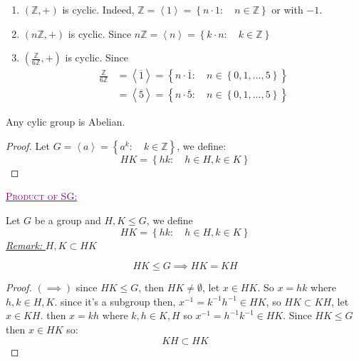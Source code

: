 \begin{example}
\begin{enumerate}
\item $(\mathbb{Z}, +)  $ is cyclic. Indeed, $\mathbb{Z} = \left\langle 1 \right\rangle  = 
  \left\{ n \cdot 1: \quad n \in \mathbb{Z} \right\}$ or with $-1$. 
  \item $\left( n \mathbb{Z}, + \right) $  is cyclic. Since $n \mathbb{Z} =\left\langle n \right\rangle  = 
    \left\{ k \cdot n: \quad k \in \mathbb{Z} \right\}$ 
    \item $\left( 
        \frac{\mathbb{Z}}{6 \mathbb{Z}}, +
      \right)$ is cyclic. Since 
      \begin{align*}
      \frac{\mathbb{Z}}{6 \mathbb{Z}} &= 
      \left\langle 
        \overline{1}
      \right\rangle = 
      \left\{ n \cdot  \overline{1}: \quad n \in \left\{ 0, 1, \hdots , 5 \right\} \right\} \\
                                      &= 
                    \left\langle \overline{5} \right\rangle  = 
                    \left\{ n \cdot \overline{5}: \quad n \in  \left\{ 0, 1, \hdots , 5 \right\} \right\}
      \end{align*}
\end{enumerate}
\end{example}
\begin{proposition}[]
Any cylic group is Abelian.
\end{proposition}
\begin{proof}
Let $G = \left\langle a \right\rangle = \left\{ a ^{k}: \quad k \in \mathbb{Z} \right\} $, we 
define: 
\[
HK = \left\{ hk: \quad h \in  H, k \in  K \right\}
\]
\end{proof}
\divider
\begin{center}
 \textcolor{purple}{\underline{\textsc{Product of SG:}}} 
\end{center}
Let $G $ be a group and $H, K \leq G $, we define 
\[
HK = 
\left\{ hk: \quad h \in H, k \in K \right\}
\]
\underline{\emph{Remark: }} $H, K \subset HK $ 
\begin{proposition}[]
\[
HK \leq G \implies 
HK = KH
\]
\end{proposition}
\begin{proof}
$( \implies )$ since $HK \leq G $, then $HK \neq  \emptyset $,
let $x \in HK $. So $x = hk$ where $h, k \in H, K$. since it's a subgroup then, $x^{-1} = k^{-1} h^{-1} \in HK$, 
so $HK \subset KH $, let $x \in  KH $. then $x = kh $ where $k, h \in  K, H $ so $x^{-1} = h^{-1} k^{-1} \in  HK $. Since
$HK \leq G $ then $x \in  HK  $ so: 
\[
KH \subset HK
\]
\end{proof}
